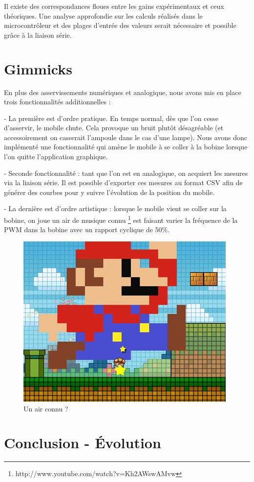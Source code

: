\documentclass[11pt, french]{article} %
\begin{document}
Il existe des correspondances floues entre les gains expérimentaux et ceux théoriques. Une analyse approfondie sur les calculs réalisés dans le microcontrôleur et des plages d'entrée des valeurs serait nécessaire et possible grâce à la liaison série.

\section{Gimmicks}
 
 En plus des asservissements numériques et analogique, nous avons mis en place trois fonctionnalités additionnelles :
 
 \medskip
 
 - La première est d'ordre pratique. En temps normal, dès que l'on cesse d'asservir, le mobile chute. Cela provoque un bruit plutôt désagréable (et  accessoirement on casserait l'ampoule dans le cas d'une lampe). Nous avons donc implémenté une fonctionnalité qui amène le mobile à se coller à la bobine lorsque l'on quitte l'application graphique. 
 
 - Seconde fonctionnalité : tant que l'on est en analogique, on acquiert les mesures via la liaison série. Il est possible d'exporter ces mesures au format CSV afin de générer des courbes pour y suivre l'évolution de la position du mobile.
 
  - La dernière est d'ordre artistique : lorsque le mobile vient se coller sur la bobine, on joue un air de musique connu \footnote{http://www.youtube.com/watch?v=Kh2AWswAMvw} est faisant varier la fréquence de la PWM dans la bobine avec un rapport cyclique de 50\%. 
  
\begin{figure}[h!]
	\centering
	\includegraphics[width = 4 cm]{SolutionNumerique/mario.png} 
	\caption{Un air connu ?}
\end{figure}
 
\section*{Conclusion - Évolution}
\end{document}
